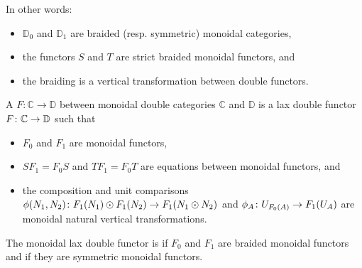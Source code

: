 In other words:
\begin{itemize}
		\item $\mathbb{D}_0$ and $\mathbb{D}_1$ are braided (resp. symmetric) monoidal categories,
		\item the functors $S$ and $T$ are strict braided monoidal functors, and
		\item the braiding is a vertical transformation between double functors.
\end{itemize}

\begin{defn}
\label{defn:monoidal_double_functor}
    A  $F \colon \mathbb{C} \to \mathbb{D}$ between monoidal double categories $\mathbb{C}$ and $\mathbb{D}$ is a lax double functor $F \colon \mathbb{C} \to \mathbb{D}$ such that
	\begin{itemize}
		\item $F_0$ and $F_1$ are monoidal functors,
		\item $SF_1= F_0S$ and $TF_1 = F_0T$ are equations between monoidal functors, and
		\item the composition and unit comparisons $\phi(N_1,N_2) \colon F_1(N_1) \odot F_1(N_2) \to F_1(N_1\odot N_2)$ and $\phi_A \colon U_{F_0 (A)} \to F_1(U_A)$ are monoidal natural vertical transformations.
	\end{itemize}
    The monoidal lax double functor is  if $F_0$ and $F_1$ are braided monoidal functors and  if they are symmetric monoidal functors. 
    

\end{defn}
